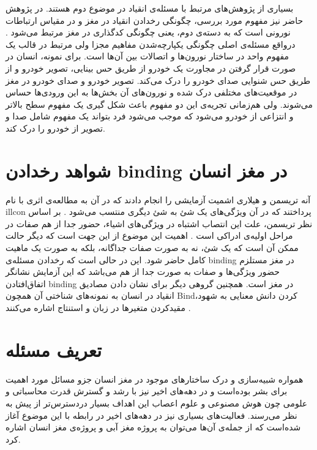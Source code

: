 \documentclass[12pt]{report}
\begin{document}
	بسیاری از پژوهش‌های مرتبط با مسئله‌ی انقیاد در موضوع دوم هستند. در پژوهش حاضر نیز مفهوم مورد بررسی، چگونگی رخدادن انقیاد در مغز و در مقیاس ارتباطات نورونی است که به دسته‌ی دوم، یعنی چگونگی کدگذاری  در مغز مرتبط می‌شود \cite{Treisman1999}. درواقع مسئله‌ی اصلی چگونگی یکپارچه‌شدن مفاهیم مجزا ولی مرتبط در قالب یک مفهوم واحد در ساختار نورون‌ها و اتصالات بین آن‌ها است.
	برای نمونه، انسان در صورت قرار گرفتن در مجاورت یک خودرو از طریق حس بینایی، تصویر خودرو و از طریق حس شنوایی صدای خودرو را درک می‌کند. تصویر خودرو و صدای خودرو در مغز در موقعیت‌های مختلفی درک شده و نورون‌های آن بخش‌ها به این ورودی‌ها حساس می‌شوند. ولی هم‌زمانی تجریه‌ی این دو مفهوم باعث شکل گیری یک مفهوم سطح بالاتر و انتزاعی از خودرو می‌شود که موجب می‌شود فرد بتواند یک مفهوم شامل صدا و تصویر از خودرو را درک کند.


\section{شواهد رخدادن \gls{binding} در مغز انسان}
\label{subsection:binding-in-human}


آنه تریسمن
و هیلاری اشمیت
آزمایشی را انجام دادند که در آن به مطالعه‌ی اثری با نام \gls{illcon}
پرداختند که در آن ویژگی‌های یک شئ به شئ دیگری منتسب می‌شود
\cite{TREISMAN1982107}.
بر اساس نظر تریسمن، علت این انتصاب اشتباه در ویژگی‌های اشیاء، حضور جدا از هم صفات در مراحل اولیه‌ی ادراکی است
\cite{goldstein_2019}.
اهمیت این موضوع از این جهت است که دیگر حالت ممکن آن است که یک شئ، نه به صورت صفات جداگانه، بلکه به صورت یک ماهیت کامل حاضر شود. این در حالی است که رخدادن مسئله‌ی \gls{binding} در مغز مستلزم حضور ویژگی‌ها و صفات به صورت جدا از هم می‌باشد که این آزمایش نشانگر اتفاق‌افتادن \gls{binding} در مغز است. همچنین گروهی دیگر برای نشان دادن مصادیق انقیاد در انسان به نمونه‌های شناختی آن همچون \gls{Bind}‌کردن دانش معنایی به شهود، مقیدکردن متغیر‌ها در زبان و استنتاج اشاره می‌کنند \cite{greff2020binding}.


\section{تعریف مسئله}
همواره شبیه‌سازی و درک ساختار‌های موجود در مغز انسان جزو مسائل مورد اهمیت برای بشر بوده‌است و در دهه‌های اخیر نیز با رشد و گسترش قدرت محاسباتی و علومی چون هوش مصنوعی و علوم اعصاب این اهداف بسیار دردسترس‌تر از پیش به نظر می‌رسند. فعالیت‌های بسیاری نیز در دهه‌های اخیر در رابطه با این موضوع آغاز شده‌است که از جمله‌ی آن‌ها می‌توان به پروژه مغز آبی و پروژه‌ی مغز انسان اشاره کرد.
\end{document}
